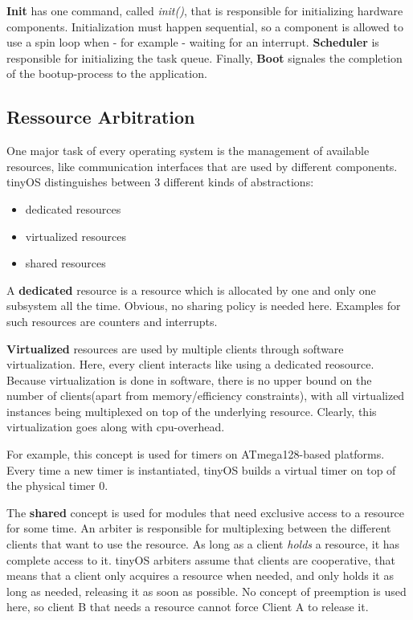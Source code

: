 \textbf{Init} has one command, called \textit{init()}, that is responsible for initializing hardware components. Initialization must happen sequential, so a component is allowed to use a spin loop when - for example - waiting for an interrupt.
\textbf{Scheduler} is responsible for initializing the task queue.
Finally, \textbf{Boot} signales the completion of the bootup-process to the application.

\subsection{Ressource Arbitration}

One major task of every operating system is the management of available resources, like communication interfaces that are used by different components. tinyOS distinguishes between 3 different kinds of abstractions:

\begin{itemize}
 \item dedicated resources
 \item virtualized resources
 \item shared resources
\end{itemize}

A \textbf{dedicated} resource is a resource which is allocated by one and only one subsystem all the time. Obvious, no sharing policy is needed here. Examples for such resources are counters and interrupts.

\textbf{Virtualized} resources are used by multiple clients through software virtualization. Here, every client interacts like using a dedicated reosource. Because virtualization is done in software, there is no upper bound on the number of clients(apart from memory/efficiency constraints), with all virtualized instances being multiplexed on top of the underlying resource. Clearly, this virtualization 
goes along with cpu-overhead.

For example, this concept is used for timers on ATmega128-based platforms. Every time a new timer is instantiated, tinyOS builds a virtual timer on top of the physical timer 0. 

The \textbf{shared} concept is used for modules that need exclusive access to a resource for some time. An arbiter is responsible for multiplexing between the different clients that want to use the resource. As long as a client \textit{holds} a resource, it has complete access to it. tinyOS arbiters assume that clients are cooperative, that means that a client only acquires a resource when needed, and only holds it as long as needed, releasing it as soon as possible. No concept of preemption is used here, so client B that needs a resource cannot force Client A to release it.  

